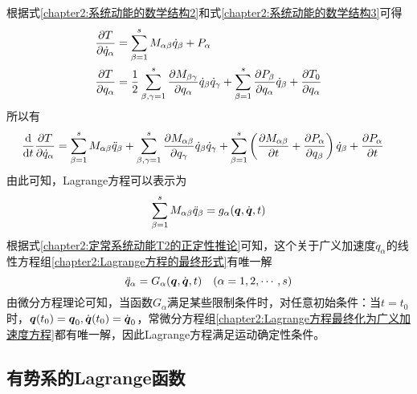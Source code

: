 根据式\eqref{chapter2:系统动能的数学结构2}和式\eqref{chapter2:系统动能的数学结构3}可得
\begin{align*}
	\frac{\partial T}{\partial \dot{q}_\alpha} & = \sum_{\beta=1}^s M_{\alpha\beta} \dot{q}_\beta + P_\alpha \\
	\frac{\partial T}{\partial q_\alpha} & = \frac12 \sum_{\beta,\gamma=1}^s \frac{\partial M_{\beta\gamma}}{\partial q_\alpha} \dot{q}_\beta \dot{q}_\gamma + \sum_{\beta=1}^s \frac{\partial P_\beta}{\partial q_\alpha} \dot{q}_\beta + \frac{\partial T_0}{\partial q_\alpha}
\end{align*}
所以有
\begin{align*}
	\frac{\mathrm{d}}{\mathrm{d} t} \frac{\partial T}{\partial \dot{q}_\alpha} & = \sum_{\beta=1}^s M_{\alpha\beta} \ddot{q}_\beta + \sum_{\beta,\gamma=1}^s \frac{\partial M_{\alpha\beta}}{\partial q_\gamma} \dot{q}_\beta \dot{q}_\gamma + \sum_{\beta=1}^s \left(\frac{\partial M_{\alpha\beta}}{\partial t} + \frac{\partial P_\alpha}{\partial q_\beta}\right) \dot{q}_\beta + \frac{\partial P_\alpha}{\partial t}
\end{align*}
由此可知，Lagrange方程可以表示为
\begin{equation}
	\sum_{\beta=1}^s M_{\alpha\beta}\ddot{q}_\beta = g_\alpha(\boldsymbol{q},\dot{\boldsymbol{q}},t)
	\label{chapter2:Lagrange方程的最终形式}
\end{equation}
根据式\eqref{chapter2:定常系统动能T2的正定性推论}可知，这个关于广义加速度$\ddot{q}_\alpha$的线性方程组\eqref{chapter2:Lagrange方程的最终形式}有唯一解
\begin{equation}
	\ddot{q}_\alpha = G_\alpha(\boldsymbol{q},\dot{\boldsymbol{q}},t)\quad (\alpha=1,2,\cdots,s)
	\label{chapter2:Lagrange方程最终化为广义加速度方程}
\end{equation}
由微分方程理论可知，当函数$G_\alpha$满足某些限制条件时，对任意初始条件：当$t=t_0$时，$\boldsymbol{q}(t_0)=\boldsymbol{q}_0, \dot{\boldsymbol{q}}(t_0) = \dot{\boldsymbol{q}}_0$，常微分方程组\eqref{chapter2:Lagrange方程最终化为广义加速度方程}都有唯一解，因此Lagrange方程满足运动确定性条件。

\subsection{有势系的Lagrange函数}


